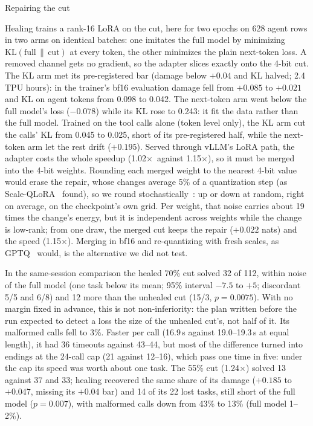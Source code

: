 \documentclass[10pt,twocolumn]{article}
\makeatletter
\newcommand{\X}{\ensuremath{\times}}
\renewcommand\section{\@startsection{section}{1}{\z@}{-2.2ex \@plus -.6ex \@minus -.2ex}{1.1ex \@plus .2ex}%
  {\normalfont\large\bfseries}}
\renewcommand\paragraph{\@startsection{paragraph}{4}{\z@}{1.4ex \@plus .5ex \@minus .2ex}{-1em}{\normalfont\normalsize\bfseries}}
\makeatother
\begin{document}
\section{Repairing the cut}\label{sec:repair}

\paragraph{Healing from the full model.} Healing trains a rank-16 LoRA on the cut, here for two epochs on 628 agent
rows in two arms on identical batches: one imitates the full model by minimizing $\mathrm{KL}(\text{full}\,\|\,
\text{cut})$ at every token, the other minimizes the plain next-token loss. A removed channel gets no gradient, so the adapter slices exactly onto the 4-bit cut. The KL
arm met its pre-registered bar (damage below $+0.04$ and KL halved; 2.4 TPU hours): in the trainer's bf16 evaluation
damage fell from $+0.085$ to $+0.021$ and KL on agent tokens from 0.098 to 0.042. The next-token arm went below the full
model's loss ($-0.078$) while its KL rose to 0.243: it fit the data rather than the full model. Trained on the tool calls alone (token level only), the KL arm
cut the calls' KL from 0.045 to 0.025, short of its pre-registered half, while the next-token arm let the rest drift
($+0.195$). Served through vLLM's
LoRA path, the adapter costs the whole speedup (1.02\X\ against 1.15\X), so it must be merged into the 4-bit weights.
Rounding each merged weight to the nearest 4-bit value would erase the repair, whose changes average 5\% of a
quantization step (as Scale-QLoRA~\citep{li2026scaleqlora} found), so we round stochastically~\citep{gupta2015deep}:
up or down at random, right on average, on the checkpoint's own grid. Per weight, that noise carries about 19 times the
change's energy, but it is independent across weights while the change is low-rank; from one draw, the merged cut keeps
the repair ($+0.022$ nats) and the speed (1.15\X). Merging in bf16 and re-quantizing with fresh scales, as
GPTQ~\citep{frantar2022gptq} would, is the alternative we did not test.

In the same-session comparison the healed 70\% cut solved 32 of 112, within noise of the full model (one task below its mean;
95\% interval $-7.5$ to $+5$; discordant 5/5 and 6/8) and 12 more than the unhealed cut (15/3, $p=0.0075$). With no
margin fixed in advance, this is not non-inferiority: the plan written before the run expected to detect a loss the
size of the unhealed cut's, not half of it. Its malformed calls fell to 3\%. Faster per call (16.9\,s against
19.0--19.3\,s at equal length), it had 36 timeouts against 43--44, but most of the difference turned into endings at
the 24-call cap (21 against 12--16), which pass one time in five: under the cap its speed was worth about one task. The
55\% cut (1.24\X) solved 13 against 37 and 33; healing recovered the same share of its damage ($+0.185$ to $+0.047$,
missing its $+0.04$ bar) and 14 of its 22 lost tasks, still short of the full model ($p=0.007$), with malformed calls
down from 43\% to 13\% (full model 1--2\%).
\end{document}
